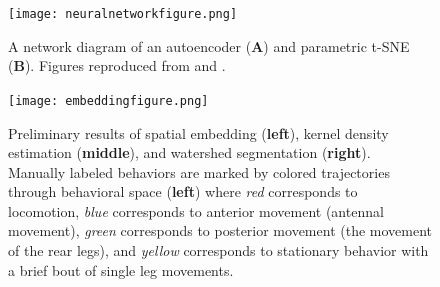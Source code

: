 \documentclass[11pt,a4paper,oneside]{article}
\begin{document}
\begin{appendices}
\begin{figure}
	\begin{center}
		\texttt{[image: neuralnetworkfigure.png]}\\
	\end{center}
	\begin{flushleft}
		\caption{A network diagram of an autoencoder (\textbf{A}) and parametric t-SNE (\textbf{B}). Figures reproduced from \citet{hinton2006autoencoder} and \citet{vandermaaten2009ptsne}.\label{fig:network}} 
	\end{flushleft}
\end{figure} 

\begin{figure}
	\begin{center}
		\texttt{[image: embeddingfigure.png]}\\
	\end{center}
	\begin{flushleft}
		\caption{Preliminary results of spatial embedding (\textbf{left}), kernel density estimation (\textbf{middle}), and watershed segmentation (\textbf{right}). Manually labeled behaviors are marked by colored trajectories through behavioral space (\textbf{left}) where \textit{red} corresponds to locomotion, \textit{blue} corresponds to anterior movement (antennal movement), \textit{green} corresponds to posterior movement (the movement of the rear legs), and \textit{yellow} corresponds to stationary behavior with a brief bout of single leg movements.  \label{fig:embedding}} 
	\end{flushleft}
\end{figure} 


\end{appendices}

\pagebreak


\end{document}

